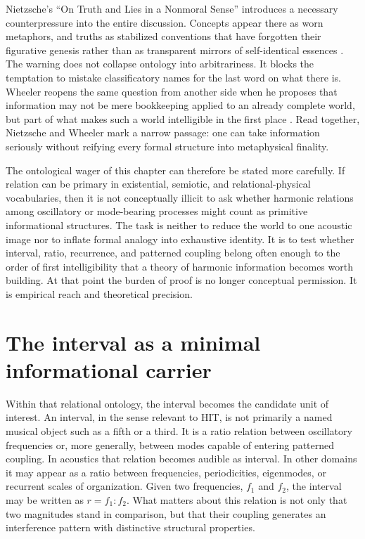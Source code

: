 Nietzsche's \enquote{On Truth and Lies in a Nonmoral Sense} introduces a necessary counterpressure into the entire discussion. Concepts appear there as worn metaphors, and truths as stabilized conventions that have forgotten their figurative genesis rather than as transparent mirrors of self-identical essences \parencite{nietzsche_1873}. The warning does not collapse ontology into arbitrariness. It blocks the temptation to mistake classificatory names for the last word on what there is. Wheeler reopens the same question from another side when he proposes that information may not be mere bookkeeping applied to an already complete world, but part of what makes such a world intelligible in the first place \parencite{wheeler_1990}. Read together, Nietzsche and Wheeler mark a narrow passage: one can take information seriously without reifying every formal structure into metaphysical finality.

The ontological wager of this chapter can therefore be stated more carefully. If relation can be primary in existential, semiotic, and relational-physical vocabularies, then it is not conceptually illicit to ask whether harmonic relations among oscillatory or mode-bearing processes might count as primitive informational structures. The task is neither to reduce the world to one acoustic image nor to inflate formal analogy into exhaustive identity. It is to test whether interval, ratio, recurrence, and patterned coupling belong often enough to the order of first intelligibility that a theory of harmonic information becomes worth building. At that point the burden of proof is no longer conceptual permission. It is empirical reach and theoretical precision.


\section{The interval as a minimal informational carrier}


Within that relational ontology, the interval becomes the candidate unit of interest. An interval, in the sense relevant to HIT, is not primarily a named musical object such as a fifth or a third. It is a ratio relation between oscillatory frequencies or, more generally, between modes capable of entering patterned coupling. In acoustics that relation becomes audible as interval. In other domains it may appear as a ratio between frequencies, periodicities, eigenmodes, or recurrent scales of organization. Given two frequencies, $f_1$ and $f_2$, the interval may be written as $r = f_1 : f_2$. What matters about this relation is not only that two magnitudes stand in comparison, but that their coupling generates an interference pattern with distinctive structural properties.


